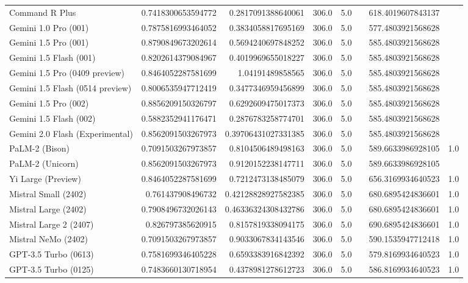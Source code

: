 \begin{table}[htp]
{\begin{tabular}{lrrrrrrr}
Command R Plus & 0.7418300653594772 & 0.2817091388640061 & 306.0 & 5.0 &  & 618.4019607843137 &  \\
Gemini 1.0 Pro (001) & 0.7875816993464052 & 0.3834058817695169 & 306.0 & 5.0 &  & 577.4803921568628 &  \\
Gemini 1.5 Pro (001) & 0.8790849673202614 & 0.5694240697848252 & 306.0 & 5.0 &  & 585.4803921568628 &  \\
Gemini 1.5 Flash (001) & 0.8202614379084967 & 0.4019969655018227 & 306.0 & 5.0 &  & 585.4803921568628 &  \\
Gemini 1.5 Pro (0409 preview) & 0.8464052287581699 & 1.04191489858565 & 306.0 & 5.0 &  & 585.4803921568628 &  \\
Gemini 1.5 Flash (0514 preview) & 0.8006535947712419 & 0.3477346959456899 & 306.0 & 5.0 &  & 585.4803921568628 &  \\
Gemini 1.5 Pro (002) & 0.8856209150326797 & 0.6292609475017373 & 306.0 & 5.0 &  & 585.4803921568628 &  \\
Gemini 1.5 Flash (002) & 0.5882352941176471 & 0.2876783258774701 & 306.0 & 5.0 &  & 585.4803921568628 &  \\
Gemini 2.0 Flash (Experimental) & 0.8562091503267973 & 0.39706431027331385 & 306.0 & 5.0 &  & 585.4803921568628 &  \\
PaLM-2 (Bison) & 0.7091503267973857 & 0.8104506489498163 & 306.0 & 5.0 &  & 589.6633986928105 & 1.0 \\
PaLM-2 (Unicorn) & 0.8562091503267973 & 0.9120152238147711 & 306.0 & 5.0 &  & 589.6633986928105 &  \\
Yi Large (Preview) & 0.8464052287581699 & 0.7212473138485079 & 306.0 & 5.0 &  & 656.3169934640523 & 1.0 \\
Mistral Small (2402) & 0.761437908496732 & 0.42128828927582385 & 306.0 & 5.0 &  & 680.6895424836601 & 1.0 \\
Mistral Large (2402) & 0.7908496732026143 & 0.46336324308432786 & 306.0 & 5.0 &  & 680.6895424836601 & 1.0 \\
Mistral Large 2 (2407) & 0.826797385620915 & 0.8157819338094175 & 306.0 & 5.0 &  & 690.6895424836601 & 1.0 \\
Mistral NeMo (2402) & 0.7091503267973857 & 0.9033067834143546 & 306.0 & 5.0 &  & 590.1535947712418 & 1.0 \\
GPT-3.5 Turbo (0613) & 0.7581699346405228 & 0.6593383916842392 & 306.0 & 5.0 &  & 579.8169934640523 & 1.0 \\
GPT-3.5 Turbo (0125) & 0.7483660130718954 & 0.4378981278612723 & 306.0 & 5.0 &  & 586.8169934640523 & 1.0 \\

\end{tabular}}
\end{table}
